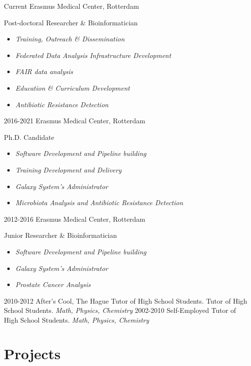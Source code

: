 \documentclass[]{shiltemann-cv}
\begin{document}
\begin{entrylist}
 \entry
    {Current}
    {Erasmus Medical Center, Rotterdam}
    {}
    {Post-doctoral Researcher \& Bioinformatician
     \begin{itemize}
     \item \emph{Training, Outreach \& Dissemination}
     \item \emph{Federated Data Analysis Infrastructure Development}
     \item \emph{FAIR data analysis}
     \item \emph{Education \& Curriculum Development}
     \item \emph{Antibiotic Resistance Detection}
     \end{itemize}}
   \entry
    {2016-2021}
    {Erasmus Medical Center, Rotterdam}
    {}
    {Ph.D. Candidate
     \begin{itemize}
     \item \emph{Software Development and Pipeline building}
     \item \emph{Training Development and Delivery}
     \item \emph{Galaxy System's Administrator}
     \item \emph{Microbiota Analysis and Antibiotic Resistance Detection}
     \end{itemize}}
   \entry
    {2012-2016}
    {Erasmus Medical Center, Rotterdam}
    {}
    {Junior Researcher \& Bioinformatician
     \begin{itemize}
     \item \emph{Software Development and Pipeline building}
     \item \emph{Galaxy System's Administrator}
     \item \emph{Prostate Cancer Analysis}
     \end{itemize}}
\end{entrylist}
\begin{entrylist}
  \entry
    {2010-2012}
    {After's Cool, The Hague}
    {Tutor of High School Students.}
    {Tutor of High School Students. \emph{Math, Physics, Chemistry}}
  \entry
    {2002-2010}
    {Self-Employed}
    {}
    {Tutor of High School Students. \emph{Math, Physics, Chemistry}}
\end{entrylist}

\section{Projects}
\end{document}
